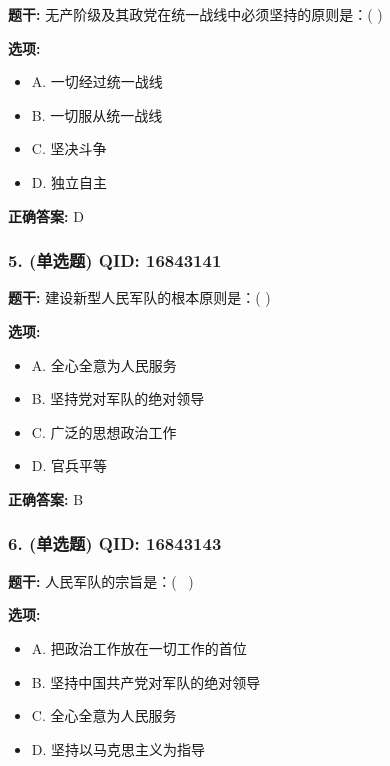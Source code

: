 \documentclass[12pt,UTF8]{ctexart}
\begin{document}
\textbf{题干:}
无产阶级及其政党在统一战线中必须坚持的原则是：( )

\textbf{选项:}
\begin{itemize}[leftmargin=*]

  \item A. 一切经过统一战线

  \item B. 一切服从统一战线

  \item C. 坚决斗争

  \item D. 独立自主

\end{itemize}

\textbf{正确答案:}
D

\vspace{0.3em}\hrulefill\vspace{0.7em}

\subsubsection*{5. (单选题) \small QID: 16843141}

\textbf{题干:}
建设新型人民军队的根本原则是：( )

\textbf{选项:}
\begin{itemize}[leftmargin=*]

  \item A. 全心全意为人民服务

  \item B. 坚持党对军队的绝对领导

  \item C. 广泛的思想政治工作

  \item D. 官兵平等

\end{itemize}

\textbf{正确答案:}
B

\vspace{0.3em}\hrulefill\vspace{0.7em}

\subsubsection*{6. (单选题) \small QID: 16843143}

\textbf{题干:}
人民军队的宗旨是：(  )

\textbf{选项:}
\begin{itemize}[leftmargin=*]

  \item A. 把政治工作放在一切工作的首位

  \item B. 坚持中国共产党对军队的绝对领导

  \item C. 全心全意为人民服务

  \item D. 坚持以马克思主义为指导

\end{itemize}
\end{document}
